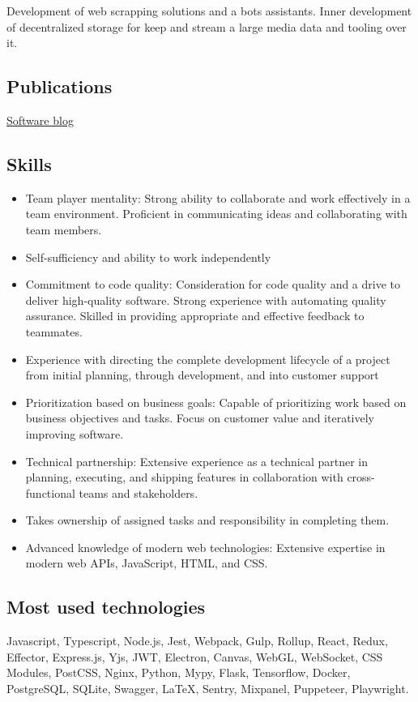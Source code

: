 \documentclass{vitonsky}
\begin{document}
Development of web scrapping solutions and a bots assistants. Inner development of decentralized storage for keep and stream a large media data and tooling over it.

\subsection*{Publications}

\href{https://vitonsky.net}{Software blog}

\subsection*{Skills}

\begin{itemize}
\item
  Team player mentality: Strong ability to collaborate and work effectively in a team environment. Proficient in communicating ideas and collaborating with team members.
\item
  Self-sufficiency and ability to work independently
\item
  Commitment to code quality: Consideration for code quality and a drive to deliver high-quality software. Strong experience with automating quality assurance. Skilled in providing appropriate and effective feedback to teammates.
\item
  Experience with directing the complete development lifecycle of a project from initial planning, through development, and into customer support
\item
  Prioritization based on business goals: Capable of prioritizing work based on business objectives and tasks. Focus on customer value and iteratively improving software.
\item
  Technical partnership: Extensive experience as a technical partner in planning, executing, and shipping features in collaboration with cross-functional teams and stakeholders.
\item
  Takes ownership of assigned tasks and responsibility in completing them.
\item
  Advanced knowledge of modern web technologies: Extensive expertise in modern web APIs, JavaScript, HTML, and CSS.
\end{itemize}

\subsection*{Most used technologies}

Javascript, Typescript, Node.js, Jest, Webpack, Gulp, Rollup,
React, Redux, Effector, Express.js, Yjs, JWT, Electron, Canvas, WebGL, WebSocket, CSS Modules, PostCSS,
Nginx, Python, Mypy, Flask, Tensorflow, Docker, PostgreSQL, SQLite, Swagger, LaTeX,
Sentry, Mixpanel, Puppeteer, Playwright.
\end{document}
